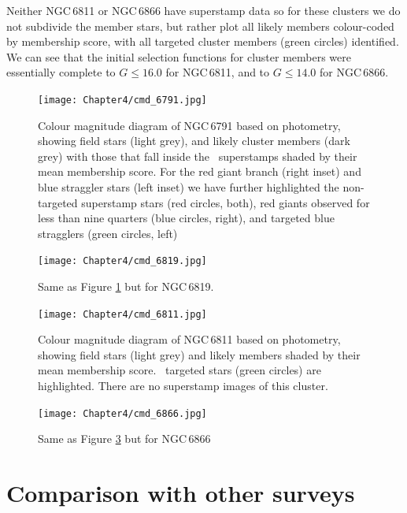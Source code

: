 Neither NGC\,6811 or NGC\,6866 have superstamp data so for these clusters we do not subdivide the member stars, but rather plot all likely members colour-coded by membership score, with all targeted cluster members (green circles) identified. We can see that the initial selection functions for cluster members were essentially complete to $G\leq16.0$ for NGC\,6811, and to $G\leq14.0$ for NGC\,6866.

\begin{figure}[hbtp]
\centering
\texttt{[image: Chapter4/cmd\_6791.jpg]}
\caption[NGC\,6791 CMD]{Colour magnitude diagram of NGC\,6791 based on \Gaia{} photometry, showing field stars (light grey), and likely cluster members (dark grey) with those that fall inside the \Kepler~superstamps shaded by their mean membership score. For the red giant branch (right inset) and blue straggler stars (left inset) we have further highlighted the non-targeted superstamp stars (red circles, both), red giants observed for less than nine quarters (blue circles, right), and targeted blue stragglers (green circles, left)} %
\label{fig:cmd6791}
\end{figure}

\begin{figure}[hbtp]
\centering
\texttt{[image: Chapter4/cmd\_6819.jpg]}
\caption[NGC\,6819 CMD]{Same as Figure \ref{fig:cmd6791} but for NGC\,6819.} %
\label{fig:cmd6819}
\end{figure}

\begin{figure}[hbtp]
\centering
\texttt{[image: Chapter4/cmd\_6811.jpg]}
\caption[NGC\,6811 CMD]{Colour magnitude diagram of NGC\,6811 based on \Gaia{} photometry, showing field stars (light grey) and likely members shaded by their mean membership score. \Kepler~targeted stars (green circles) are highlighted. There are no superstamp images of this cluster.}
\label{fig:cmd6811}
\end{figure} %

\begin{figure}[hbtp]
\centering
\texttt{[image: Chapter4/cmd\_6866.jpg]}
\caption[NGC\,6866 CMD]{Same as Figure \ref{fig:cmd6811} but for NGC\,6866}
\label{fig:cmd6866}
\end{figure} %
\newpage

\section{Comparison with other surveys}
